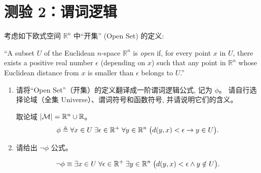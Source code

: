 
\newpage
\section{测验 2：谓词逻辑}

\begin{problem}[一阶谓词逻辑公式]
  考虑如下欧式空间 $\mathbb{R}^{n}$ 中``开集'' (Open Set) 的定义:

  ``A subset $U$ of the Euclidean $n$-space $\mathbb{R}^{n}$
    is {\it open} if, for every point $x$ in $U$,
    there exists a positive real number $\epsilon$
    (depending on $x$) such that any point in $\mathbb{R}^{n}$
    whose Euclidean distance from $x$ is smaller than $\epsilon$
    belongs to $U$.''

  \begin{enumerate}[(1)]
    \item 请将``Open Set''（开集）的定义翻译成一阶谓词逻辑公式,
      记为 $\phi$。
      请自行选择论域（全集 Universe）、谓词符号和函数符号, 并请说明它们的含义。
      \begin{solution}
        取论域 $|\mathcal{M}|=\mathbb{R}^{n} \cup \mathbb{R}$。
        \[
          \phi \triangleq
          \forall x \in U \;\exists \epsilon \in \mathbb{R}^{+}\;
					  \forall y \in \mathbb{R}^{n}\;
            \bigl(d(y,x) < \epsilon \to y \in U\bigr).
        \]
      \end{solution}
    \item 请给出 $\lnot \phi$ 公式。
      \begin{solution}
        \[
          \begin{aligned}
            \lnot\phi
              \equiv \exists x \in U \;\forall \epsilon \in \mathbb{R}^{+}\;\exists y \in \mathbb{R}^{n}\;
              \bigl(d(y,x) < \epsilon \land y \notin U\bigr).
          \end{aligned}
        \]
      \end{solution}
  \end{enumerate}
\end{problem}

